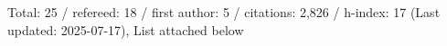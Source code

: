 Total: 25 / refereed: 18 / first author: 5 / citations: 2,826 / h-index: 17 (Last updated: 2025-07-17), List attached below